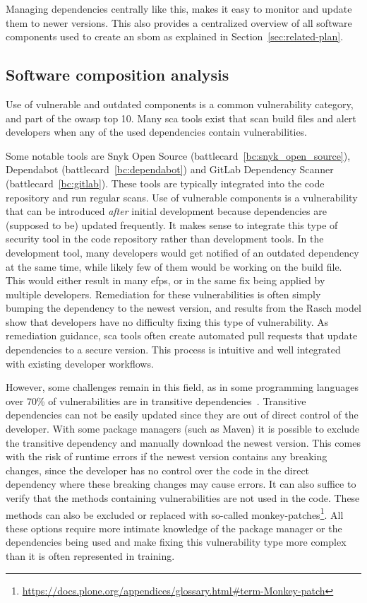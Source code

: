 Managing dependencies centrally like this, makes it easy to monitor and update them to newer versions.
This also provides a centralized overview of all software components used to create an \gls{sbom} as explained in Section~\ref{sec:related-plan}.

\subsection{Software composition analysis}
Use of vulnerable and outdated components is a common vulnerability category, and part of the \gls{owasp} top 10.
Many \gls{sca} tools exist that scan build files and alert developers when any of the used dependencies contain vulnerabilities.

Some notable tools are Snyk Open Source (battlecard~\ref{bc:snyk_open_source}), Dependabot (battlecard~\ref{bc:dependabot}) and GitLab Dependency Scanner (battlecard~\ref{bc:gitlab}).
These tools are typically integrated into the code repository and run regular scans.
Use of vulnerable components is a vulnerability that can be introduced \textit{after} initial development because dependencies are (supposed to be) updated frequently.
It makes sense to integrate this type of security tool in the code repository rather than development tools.
In the development tool, many developers would get notified of an outdated dependency at the same time, while likely few of them would be working on the build file.
This would either result in many \glspl{efp}, or in the same fix being applied by multiple developers.
Remediation for these vulnerabilities is often simply bumping the dependency to the newest version, and results from the Rasch model show that developers have no difficulty fixing this type of vulnerability.
As remediation guidance, \gls{sca} tools often create automated pull requests that update dependencies to a secure version.
This process is intuitive and well integrated with existing developer workflows.

However, some challenges remain in this field, as in some programming languages over 70\% of vulnerabilities are in transitive dependencies~\cite{snyk2020}.
Transitive dependencies can not be easily updated since they are out of direct control of the developer.
With some package managers (such as Maven) it is possible to exclude the transitive dependency and manually download the newest version.
This comes with the risk of runtime errors if the newest version contains any breaking changes, since the developer has no control over the code in the direct dependency where these breaking changes may cause errors.
It can also suffice to verify that the methods containing vulnerabilities are not used in the code.
These methods can also be excluded or replaced with so-called monkey-patches\footnote{\url{https://docs.plone.org/appendices/glossary.html\#term-Monkey-patch}}.
All these options require more intimate knowledge of the package manager or the dependencies being used and make fixing this vulnerability type more complex than it is often represented in training.
